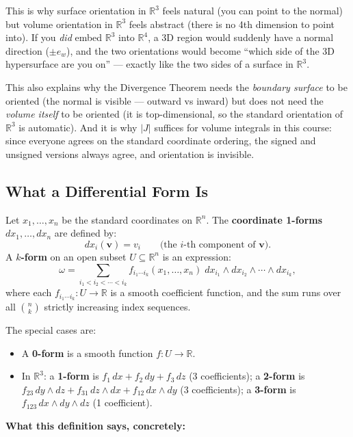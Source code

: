 \documentclass[11pt]{report}
\newcommand{\R}{\mathbb{R}}
\begin{document}
This is why surface orientation in $\R^3$ feels natural (you can point to the normal) but volume orientation in $\R^3$ feels abstract (there is no 4th dimension to point into). If you \textit{did} embed $\R^3$ into $\R^4$, a 3D region would suddenly have a normal direction ($\pm\hat{e}_w$), and the two orientations would become ``which side of the 3D hypersurface are you on'' --- exactly like the two sides of a surface in $\R^3$.

This also explains why the Divergence Theorem needs the \textit{boundary surface} to be oriented (the normal is visible --- outward vs inward) but does not need the \textit{volume itself} to be oriented (it is top-dimensional, so the standard orientation of $\R^3$ is automatic). And it is why $|J|$ suffices for volume integrals in this course: since everyone agrees on the standard coordinate ordering, the signed and unsigned versions always agree, and orientation is invisible.

\subsection{What a Differential Form Is}

\begin{definition}
Let $x_1, \ldots, x_n$ be the standard coordinates on $\R^n$. The \textbf{coordinate 1-forms} $dx_1, \ldots, dx_n$ are defined by:
\[
dx_i(\mathbf{v}) = v_i \qquad \text{(the $i$-th component of $\mathbf{v}$)}.
\]
A \textbf{$k$-form} on an open subset $U \subseteq \R^n$ is an expression:
\[
\omega = \sum_{i_1 < i_2 < \cdots < i_k} f_{i_1 \cdots i_k}(x_1, \ldots, x_n) \; dx_{i_1} \wedge dx_{i_2} \wedge \cdots \wedge dx_{i_k},
\]
where each $f_{i_1 \cdots i_k}: U \to \R$ is a smooth coefficient function, and the sum runs over all $\binom{n}{k}$ strictly increasing index sequences.

The special cases are:
\begin{itemize}
    \item A \textbf{0-form} is a smooth function $f: U \to \R$.
    \item In $\R^3$: a \textbf{1-form} is $f_1\,dx + f_2\,dy + f_3\,dz$ (3 coefficients); a \textbf{2-form} is $f_{23}\,dy \wedge dz + f_{31}\,dz \wedge dx + f_{12}\,dx \wedge dy$ (3 coefficients); a \textbf{3-form} is $f_{123}\,dx \wedge dy \wedge dz$ (1 coefficient).
\end{itemize}
\end{definition}

\textbf{What this definition says, concretely:}
\end{document}
